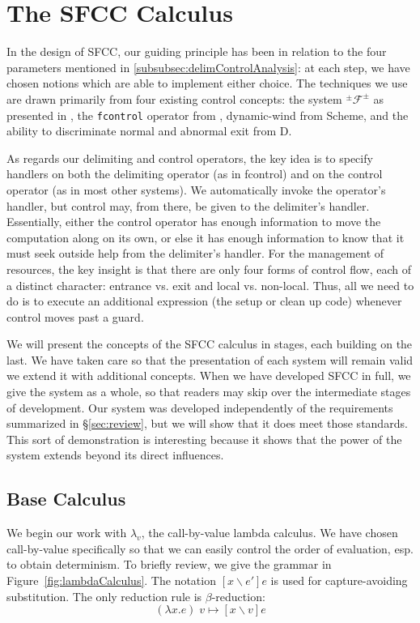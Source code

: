 \documentclass[11pt]{article}
\newcommand{\maybePage}{\newpage}
\newcommand\x{\lambda x}
\newcommand\F{\mathcal{F}}
\newcommand\pmFpm{^\pm\F^\pm}
\begin{document}
\maybePage
\section{The SFCC Calculus}

In the design of SFCC, our guiding principle has been in relation to the four parameters mentioned in \ref{subsubsec:delimControlAnalysis}:
at each step, we have chosen notions which are able to implement either choice.
The techniques we use are drawn primarily from four existing control concepts:
the system $\pmFpm$ as presented in \cite{MFDC}, the \texttt{fcontrol} operator from \cite{HandlingControl}, dynamic-wind from Scheme, and the ability to discriminate normal and abnormal exit from D.

As regards our delimiting and control operators, the key idea is to specify handlers on both the delimiting operator (as in fcontrol) and on the control operator (as in most other systems).
We automatically invoke the operator's handler, but control may, from there, be given to the delimiter's handler.
Essentially, either the control operator has enough information to move the computation along on its own, or else it has enough information to know that it must seek outside help from the delimiter's handler.
For the management of resources, the key insight is that there are only four forms of control flow, each of a distinct character: entrance vs. exit and local vs. non-local.
Thus, all we need to do is to execute an additional expression (the setup or clean up code) whenever control moves past a guard.

We will present the concepts of the SFCC calculus in stages, each building on the last.
We have taken care so that the presentation of each system will remain valid we extend it with additional concepts.
When we have developed SFCC in full, we give the system as a whole, so that readers may skip over the intermediate stages of development.
Our system was developed independently of the requirements summarized in \S\ref{sec:review}, but we will show that it does meet those standards.
This sort of demonstration is interesting because it shows that the power of the system extends beyond its direct influences.

\subsection{Base Calculus}

We begin our work with $\lambda_v$, the call-by-value lambda calculus.
We have chosen call-by-value specifically so that we can easily control the order of evaluation, esp. to obtain determinism.
To briefly review, we give the grammar in Figure~\ref{fig:lambdaCalculus}.
The notation $[x \backslash e']e$ is used for capture-avoiding substitution.
The only reduction rule is $\beta$-reduction:
$$(\x.e)\;v \mapsto [x \backslash v]e$$
\end{document}
